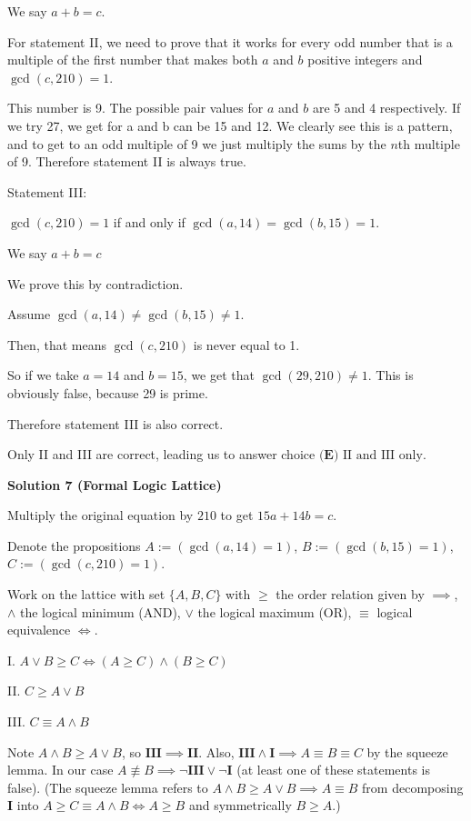 \begin{enumerate}
 We say  \( a + b = c \).

 For statement II, we need to prove that it works for every odd number that is a multiple of the first number that makes both \(a\) and \(b\) positive integers and \( \gcd(c,210) = 1 \). 

 This number is 9. The possible pair values for \(a\) and \(b\) are 5 and 4 respectively. If we try 27, we get for a and b can be 15 and 12. We clearly see this is a pattern, and to get to an odd multiple of 9 we just multiply the sums by the \( n \)th multiple of 9. Therefore statement II is always true.

 Statement III:

 \( \gcd(c,210) = 1 \) if and only if \( \gcd(a,14) = \gcd(b,15) = 1 \).

 We say \( a + b = c \)

 We prove this by contradiction. 

 Assume \( \gcd(a,14) \neq \gcd(b,15) \neq 1 \). 

 Then, that means \( \gcd(c,210) \) is never equal to 1. 

 So if we take \( a = 14 \) and \( b = 15 \), we get that \( \gcd(29,210) \neq 1 \). This is obviously false, because 29 is prime. 

 Therefore statement III is also correct.

 Only II and III are correct, leading us to answer choice $\boxed{\textbf{(E) }\text{II and III only}}.$




\textbf{Solution 7 (Formal Logic Lattice)}

Multiply the original equation by $210$ to get $15a+14b=c$.

 Denote the propositions $A:=(\gcd(a,14)=1)$, $B:=(\gcd(b,15)=1)$, $C:=(\gcd(c,210)=1)$.

 Work on the lattice with set $\{ A,B,C \}$ with $\ge$ the order relation given by $\implies$, $\land$ the logical minimum (AND), $\lor$ the logical maximum (OR), $\equiv$ logical equivalence $\iff$.

 I. $A\lor B\ge C\iff (A\ge C)\land (B\ge C)$

 II. $C\ge A\lor B$

 III. $C\equiv A\land B$

 Note $A\land B\ge A\lor B$, so $\mathbf{III}\implies \mathbf{II}$. Also, $\mathbf{III}\land\mathbf{I}\implies A\equiv B\equiv C$ by the squeeze lemma. In our case $A\not\equiv B\implies\neg \mathbf{III}\lor \neg \mathbf{I}$ (at least one of these statements is false). (The squeeze lemma refers to $A\land B\ge A\lor B\implies A\equiv B$ from decomposing $\mathbf{I}$ into $A\ge C\equiv A\land B \iff A\ge B$ and symmetrically $B\ge A$.)


\end{enumerate}
